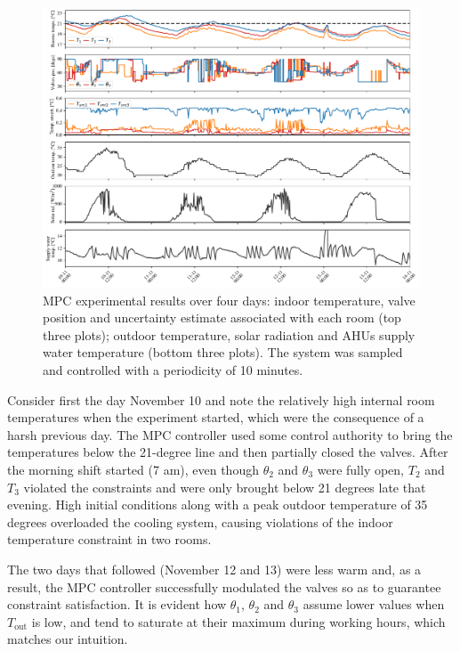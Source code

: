 \begin{figure}[!t]
	\centering
	\includegraphics[width=1\linewidth]{../images/chap3_expres.pdf} 
	\caption{MPC experimental results over four days: indoor temperature, valve position and uncertainty estimate associated with each room (top three plots); outdoor temperature, solar radiation and AHUs supply water temperature (bottom three plots). The system was sampled and controlled with a periodicity of 10 minutes.}
	\label{fig.prettyCool}
\end{figure}

Consider first the day November 10 and note the relatively high internal room temperatures when the experiment started, which were the consequence of a harsh previous day. The MPC controller used some control authority to bring the temperatures below the 21-degree line and then partially closed the valves. After the morning shift started (7 am), even though $\theta_2$ and $\theta_3$ were fully open, $T_2$ and $T_3$ violated the constraints and were only brought below 21 degrees late that evening. High initial conditions along with a peak outdoor temperature of 35 degrees overloaded the cooling system, causing violations of the indoor temperature constraint in two rooms. 

The two days that followed (November 12 and 13) were less warm and, as a result, the MPC controller successfully modulated the valves so as to guarantee constraint satisfaction. It is evident how $\theta_1$, $\theta_2$ and $\theta_3$ assume lower values when $T_\text{out}$ is low, and tend to saturate at their maximum during working hours, which matches our intuition. 

